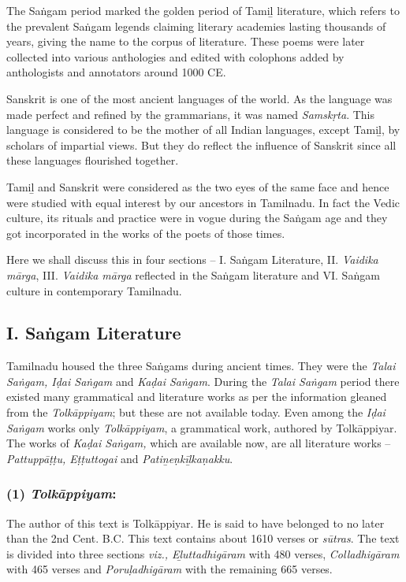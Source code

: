The Saṅgam period marked the golden period of Tamiḻ literature, which refers to the prevalent Saṅgam legends claiming literary academies lasting thousands of years, giving the name to the corpus of literature. These poems were later collected into various anthologies and edited with colophons added by anthologists and annotators around 1000 CE.

Sanskrit is one of the most ancient languages of the world. As the language was made perfect and refined by the grammarians, it was named \textit{Samskṛta}. This language is considered to be the mother of all Indian languages, except Tamiḻ, by scholars of impartial views. But they do reflect the influence of Sanskrit since all these languages flourished together.

Tamiḻ and Sanskrit were considered as the two eyes of the same face and hence were studied with equal interest by our ancestors in Tamilnadu. In fact the Vedic culture, its rituals and practice were in vogue during the Saṅgam age and they got incorporated in the works of the poets of those times.

Here we shall discuss this in four sections – I. Saṅgam Literature, II. \textit{Vaidika mārga}, III. \textit{Vaidika mārga} reflected in the Saṅgam literature and VI. Saṅgam culture in contemporary Tamilnadu.

\newpage

\subsection*{I. Saṅgam Literature}

Tamilnadu housed the three Saṅgams during ancient times. They were the \textit{Talai Saṅgam, Iḍai Saṅgam} and \textit{Kaḍai Saṅgam}. During the \textit{Talai Saṅgam} period there existed many grammatical and literature works as per the information gleaned from the \textit{Tolkāppiyam}; but these are not available today. Even among the \textit{Iḍai Saṅgam} works only \textit{Tolkāppiyam}, a grammatical work, authored by Tolkāppiyar. The works of \textit{Kaḍai Saṅgam,} which are available now, are all literature works – \textit{Pattuppāṭṭu, Eṭṭuttogai} and \textit{Patiṉeṇkīḻkaṇakku}.

\subsubsection*{(1)\textit{ Tolkāppiyam}:}

\vskip -7pt

The author of this text is Tolkāppiyar. He is said to have belonged to no later than the 2nd Cent. B.C. This text contains about 1610 verses or \textit{sūtras}. The text is divided into three sections \textit{viz., Eḻuttadhigāram} with 480 verses, \textit{Colladhigāram} with 465 verses and \textit{Poruḷadhigāram} with the remaining 665 verses.

